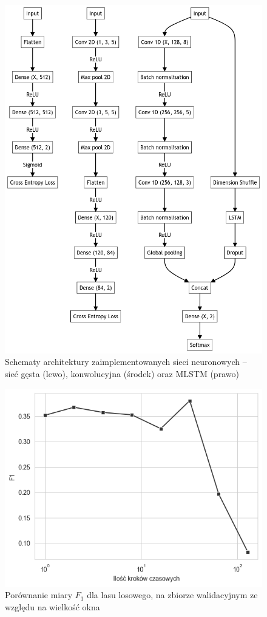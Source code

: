 \documentclass{./assets/wfis}
\begin{document}
\begin{figure}
    \centering
    \includegraphics[width=\columnwidth]{thesis/assets/archs.png}
    \caption[Schematy architektury zaimplementowanych sieci neuronowych]{Schematy architektury zaimplementowanych sieci neuronowych – sieć gęsta (lewo), konwolucyjna (środek) oraz MLSTM (prawo)}
    \label{fig:arch}
\end{figure}

\begin{figure}[h!]
    \centering
    \includegraphics[width=0.5\columnwidth]{thesis/assets/window_size_vs_f1.png}
    \caption{Porównanie miary $F_1$ dla lasu losowego, na zbiorze walidacyjnym ze względu na wielkość okna}
    \label{fig:window-size}
\end{figure}
\end{document}
